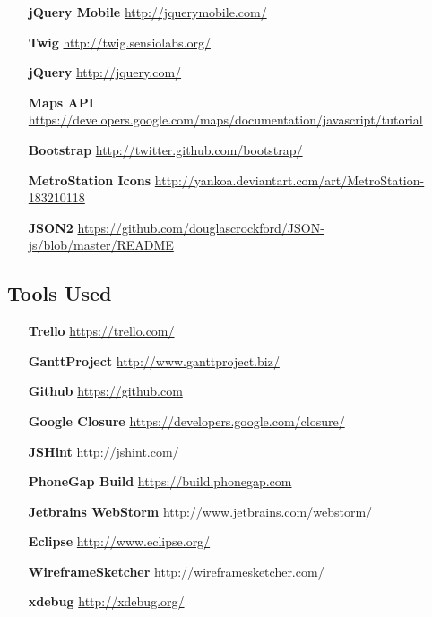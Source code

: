 \documentclass[12pt]{ecsproject}     %
\begin{document}
\begin{itemize}
\item[\textbf{jQuery Mobile}] \href{http://jquerymobile.com/}{http://jquerymobile.com/}
\item[\textbf{Twig}] \href{http://twig.sensiolabs.org/}{http://twig.sensiolabs.org/}
\item[\textbf{jQuery}] \href{http://jquery.com/}{http://jquery.com/}
\item[\textbf{Maps API}] \href{https://developers.google.com/maps/documentation/javascript/tutorial}{https://developers.google.com/maps/documentation/javascript/tutorial}
\item[\textbf{Bootstrap}] \href{http://twitter.github.com/bootstrap/}{http://twitter.github.com/bootstrap/}
\item[\textbf{MetroStation Icons}] \href{http://yankoa.deviantart.com/art/MetroStation-183210118}{http://yankoa.deviantart.com/art/MetroStation-183210118}
\item[\textbf{JSON2}] \href{https://github.com/douglascrockford/JSON-js/blob/master/README}{https://github.com/douglascrockford/JSON-js/blob/master/README}
\end{itemize}

\subsection{Tools Used}
\label{sec:tools}
\begin{itemize}
\item[\textbf{Trello}]\href{https://trello.com/}{https://trello.com/}
\item[\textbf{GanttProject}] \href{http://www.ganttproject.biz/}{http://www.ganttproject.biz/}
\item[\textbf{Github}]\href{https://github.com}{https://github.com}
\item[\textbf{Google Closure}]\href{https://developers.google.com/closure/}{https://developers.google.com/closure/}
\item[\textbf{JSHint}]\href{http://jshint.com/}{http://jshint.com/}
\item[\textbf{PhoneGap Build}]\href{https://build.phonegap.com}{https://build.phonegap.com}
\item[\textbf{Jetbrains WebStorm}]\href{http://www.jetbrains.com/webstorm/}{http://www.jetbrains.com/webstorm/}
\item[\textbf{Eclipse}]\href{http://www.eclipse.org/}{http://www.eclipse.org/}
\item[\textbf{WireframeSketcher}]\href{http://wireframesketcher.com/}{http://wireframesketcher.com/}
\item[\textbf{xdebug}]\href{http://xdebug.org/}{http://xdebug.org/}
\end{itemize}
\end{document}
